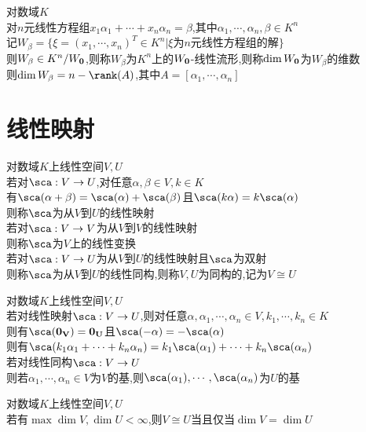 \begin{dingli}
对数域$K$\\
对$n$元线性方程组$x_1\alpha_1+\cdots+x_n\alpha_n=\beta$,其中$\alpha_1,\cdots,\alpha_n,\beta\in K^n$\\
记$W_{\beta}=\{\xi=(x_1,\cdots,x_n)^{T}\in K^n|\xi\text{为}n\text{元线性方程组的解}\}$\\
则$W_{\beta}\in K^n/W_{\bf0}$,则称$W_{\beta}$为$K^n$上的$W_{\bf0}$-线性流形,则称$\dim W_{\bf0}$为$W_{\beta}$的维数\\
则$\dim W_{\beta}=n-\rank(A)$,其中$A=[\alpha_1,\cdots,\alpha_n]$
\end{dingli}

\chapter{线性映射}

\begin{dingyi}
对数域$K$上线性空间$V,U$\\
若对$\sca:V\to U$,对任意$\alpha,\beta\in V,k\in K$\\
有$\sca(\alpha+\beta)=\sca(\alpha)+\sca(\beta)$且$\sca(k\alpha)=k\sca(\alpha)$\\
则称$\sca$为从$V$到$U$的线性映射\\
若对$\sca:V\to V$为从$V$到$V$的线性映射\\
则称$\sca$为$V$上的线性变换\\
若对$\sca:V\to U$为从$V$到$U$的线性映射且$\sca$为双射\\
则称$\sca$为从$V$到$U$的线性同构,则称$V,U$为同构的,记为$V\cong U$
\end{dingyi}

\begin{dingli}
对数域$K$上线性空间$V,U$\\
若对线性映射$\sca:V\to U$,则对任意$\alpha,\alpha_1,\cdots,\alpha_n\in V,k_1,\cdots,k_n\in K$\\
则有$\sca({\bf0_{V}})={\bf0_{U}}$且$\sca(-\alpha)=-\sca(\alpha)$\\
则有$\sca(k_1\alpha_1+\cdots+k_n\alpha_n)=k_1\sca(\alpha_1)+\cdots+k_n\sca(\alpha_n)$\\
若对线性同构$\sca:V\to U$\\
则若$\alpha_1,\cdots,\alpha_n\in V$为$V$的基,则$\sca(\alpha_1),\cdots,\sca(\alpha_n)$为$U$的基
\end{dingli}

\begin{dingli}
对数域$K$上线性空间$V,U$\\
若有$\max{\dim V,\dim U}<\infty$,则$V\cong U$当且仅当$\dim V=\dim U$
\end{dingli}

